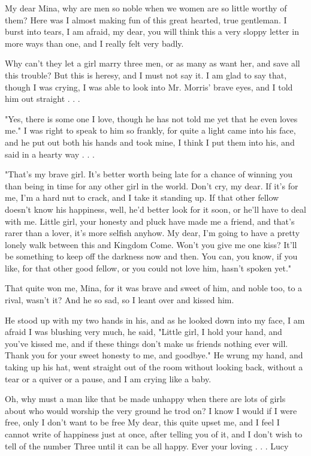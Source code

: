 My dear Mina, why are men so noble when we women are so little worthy of them? Here was I almost making fun of this great hearted, true gentleman. I burst into tears, I am afraid, my dear, you will think this a very sloppy letter in more ways than one, and I really felt very badly. 

Why can't they let a girl marry three men, or as many as want her, and save all this trouble? But this is heresy, and I must not say it. I am glad to say that, though I was crying, I was able to look into Mr. Morris' brave eyes, and I told him out straight . . . 

"Yes, there is some one I love, though he has not told me yet that he even loves me." I was right to speak to him so frankly, for quite a light came into his face, and he put out both his hands and took mine, I think I put them into his, and said in a hearty way . . . 

"That's my brave girl. It's better worth being late for a chance of winning you than being in time for any other girl in the world. Don't cry, my dear. If it's for me, I'm a hard nut to crack, and I take it standing up. If that other fellow doesn't know his happiness, well, he'd better look for it soon, or he'll have to deal with me. Little girl, your honesty and pluck have made me a friend, and that's rarer than a lover, it's more selfish anyhow. My dear, I'm going to have a pretty lonely walk between this and Kingdom Come. Won't you give me one kiss? It'll be something to keep off the darkness now and then. You can, you know, if you like, for that other good fellow, or you could not love him, hasn't spoken yet." 

That quite won me, Mina, for it was brave and sweet of him, and noble too, to a rival, wasn't it? And he so sad, so I leant over and kissed him. 

He stood up with my two hands in his, and as he looked down into my face, I am afraid I was blushing very much, he said, "Little girl, I hold your hand, and you've kissed me, and if these things don't make us friends nothing ever will. Thank you for your sweet honesty to me, and goodbye." He wrung my hand, and taking up his hat, went straight out of the room without looking back, without a tear or a quiver or a pause, and I am crying like a baby. 

Oh, why must a man like that be made unhappy when there are lots of girls about who would worship the very ground he trod on? I know I would if I were free, only I don't want to be free My dear, this quite upset me, and I feel I cannot write of happiness just at once, after telling you of it, and I don't wish to tell of the number Three until it can be all happy. Ever your loving . . . Lucy 

